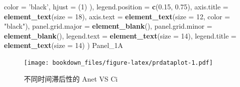 \documentclass[
]{krantz}
\makeatletter
\newenvironment{Shaded}{\begin{snugshade}}{\end{snugshade}}
\newcommand{\DataTypeTok}[1]{\textcolor[rgb]{0.13,0.29,0.53}{#1}}
\newcommand{\DecValTok}[1]{\textcolor[rgb]{0.00,0.00,0.81}{#1}}
\newcommand{\FloatTok}[1]{\textcolor[rgb]{0.00,0.00,0.81}{#1}}
\newcommand{\KeywordTok}[1]{\textcolor[rgb]{0.13,0.29,0.53}{\textbf{#1}}}
\newcommand{\NormalTok}[1]{#1}
\newcommand{\StringTok}[1]{\textcolor[rgb]{0.31,0.60,0.02}{#1}}
\newenvironment{kframe}{%
\medskip{}
\setlength{\fboxsep}{.8em}
 \def\at@end@of@kframe{}%
 \ifinner\ifhmode%
  \def\at@end@of@kframe{\end{minipage}}%
  \begin{minipage}{\columnwidth}%
 \fi\fi%
 \def\FrameCommand##1{\hskip\@totalleftmargin \hskip-\fboxsep
 \colorbox{shadecolor}{##1}\hskip-\fboxsep
     \hskip-\linewidth \hskip-\@totalleftmargin \hskip\columnwidth}%
 \MakeFramed {\advance\hsize-\width
   \@totalleftmargin\z@ \linewidth\hsize
   \@setminipage}}%
 {\par\unskip\endMakeFramed%
 \at@end@of@kframe}
\renewenvironment{Shaded}{\begin{kframe}}{\end{kframe}}
\makeatother
\begin{document}
\begin{Shaded}
\begin{Highlighting}[]
        \DataTypeTok{color =} \StringTok{'black'}\NormalTok{,}
        \DataTypeTok{hjust =}\NormalTok{ (}\DecValTok{1}\NormalTok{)}
\NormalTok{      ),}
    \DataTypeTok{legend.position =} \KeywordTok{c}\NormalTok{(}\FloatTok{0.15}\NormalTok{, }\FloatTok{0.75}\NormalTok{),}
    \DataTypeTok{axis.title =} \KeywordTok{element_text}\NormalTok{(}\DataTypeTok{size =} \DecValTok{18}\NormalTok{),}
    \DataTypeTok{axis.text =} \KeywordTok{element_text}\NormalTok{(}\DataTypeTok{size =} \DecValTok{12}\NormalTok{, }\DataTypeTok{color =} \StringTok{"black"}\NormalTok{),}
    \DataTypeTok{panel.grid.major =} \KeywordTok{element_blank}\NormalTok{(),}
    \DataTypeTok{panel.grid.minor =} \KeywordTok{element_blank}\NormalTok{(),}
    \DataTypeTok{legend.text =} \KeywordTok{element_text}\NormalTok{(}\DataTypeTok{size =} \DecValTok{14}\NormalTok{),}
    \DataTypeTok{legend.title =} \KeywordTok{element_text}\NormalTok{(}\DataTypeTok{size =} \DecValTok{14}\NormalTok{)}
\NormalTok{  )}
\NormalTok{Panel_1A}
\end{Highlighting}
\end{Shaded}

\begin{figure}
\centering
\texttt{[image: bookdown\_files/figure-latex/prdataplot-1.pdf]}
\caption{\label{fig:prdataplot}不同时间滞后性的 Anet VS Ci}
\end{figure}
\end{document}

